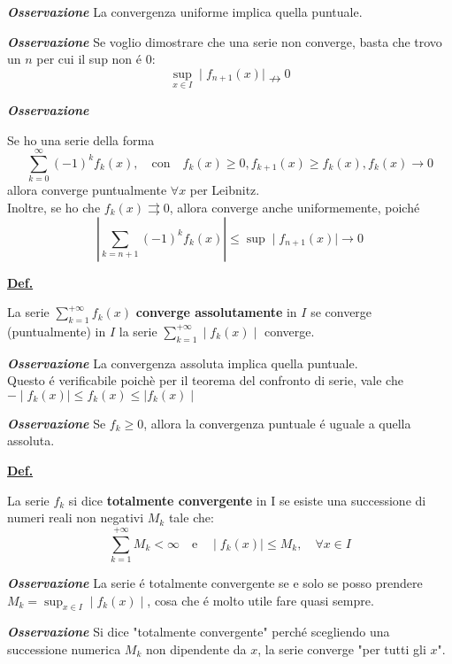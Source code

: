 \documentclass[a4paper,10pt]{article} %
\renewcommand{\b}[1]{%
    {\textbf{#1}}}
\newcommand{\ldef}[1]{%
    {\smallbreak\par\tiny\textbf{\underline{Def.}} {#1} \smallbreak}}
\newcommand{\loss}[1]{%
    {\smallbreak\par\tiny\emph{\textbf{Osservazione}} {#1} \par}}
\begin{document}
\begin{multicols}{6}
{    \loss{
        La convergenza uniforme implica quella puntuale.
    }
    \loss{
        Se voglio dimostrare che una serie non converge, basta che trovo 
        un $n$ per cui il sup non é 0:
        \[
            \sup_{x\in I} \mid f_{n+1}(x) \mid \nrightarrow 0
        \]
    }
    \loss{
        Se ho una serie della forma 
        \[
            \sum_{k=0}^\infty (-1)^k f_k(x), \quad \text{con} \quad
            f_k(x) \geq 0, f_{k+1}(x) \geq f_k(x), f_k(x) \rightarrow 0
        \]
        allora converge puntualmente $\forall x$ per Leibnitz.\\
        Inoltre, se ho che $f_k(x) \rightrightarrows 0$, allora converge
        anche uniformemente, poiché  
        \[ 
            \displaystyle \left| \sum_{k=n+1}  (-1)^k f_k(x) \right| \leq \sup \mid f_{n+1} (x) \mid \rightarrow 0
        \]
        
    }
}

\ldef{
    La serie $\displaystyle \sum_{k=1}^{+\infty} f_k(x)$  \b{converge
    assolutamente} in $I$ se converge (puntualmente) in $I$ la serie
    $\displaystyle \sum_{k=1}^{+\infty} \mid f_k(x) \mid$ converge.
    \loss{
        La convergenza assoluta implica quella puntuale. \\ Questo \'{e}
        verificabile poich\`{e} per il teorema del confronto di serie, vale che
        $ -\mid f_k(x) \mid \leq f_k(x) \leq \mid f_k(x) \mid $
    }
    \loss{
        Se $ f_k \geq 0$, allora la convergenza puntuale \'{e} uguale a quella
        assoluta.
    }

}

\ldef{
    La serie $f_k$ si dice \b{totalmente convergente} in I se esiste
    una successione di numeri reali non negativi $M_k$ tale che:
    \[ 
        \sum_{k=1}^{+\infty} M_k < \infty \quad
        \text{e} \quad \mid f_k(x) \mid \leq M_k, \quad \forall x \in I 
    \]
    \loss{
        La serie \'{e} totalmente convergente se e solo se posso prendere
        $\displaystyle M_k = \sup_{x\in I} \mid f_k(x) \mid $, cosa che
        \'{e} molto utile fare quasi sempre.
    }
    \loss{
        Si dice "totalmente convergente" perch\'e scegliendo una 
        successione numerica $M_k$ non dipendente da $x$, la serie
        converge "per tutti gli $x$".
    }
}



\end{multicols}
\end{document}
